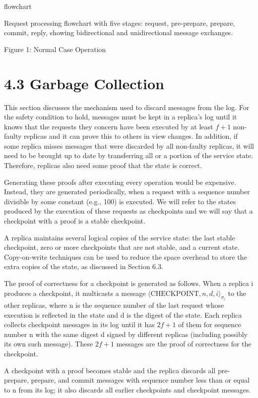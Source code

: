 \documentclass[
]{article}
\begin{document}
flowchart

Request processing flowchart with five stages: request, pre-prepare,
prepare, commit, reply, showing bidirectional and unidirectional message
exchanges.

Figure 1: Normal Case Operation

\section{4.3 Garbage Collection}\label{garbage-collection}

This section discusses the mechanism used to discard messages from the
log. For the safety condition to hold, messages must be kept in a
replica's log until it knows that the requests they concern have been
executed by at least \(f + 1\) non-faulty replicas and it can prove this
to others in view changes. In addition, if some replica misses messages
that were discarded by all non-faulty replicas, it will need to be
brought up to date by transferring all or a portion of the service
state. Therefore, replicas also need some proof that the state is
correct.

Generating these proofs after executing every operation would be
expensive. Instead, they are generated periodically, when a request with
a sequence number divisible by some constant (e.g., 100) is executed. We
will refer to the states produced by the execution of these requests as
checkpoints and we will say that a checkpoint with a proof is a stable
checkpoint.

A replica maintains several logical copies of the service state: the
last stable checkpoint, zero or more checkpoints that are not stable,
and a current state. Copy-on-write techniques can be used to reduce the
space overhead to store the extra copies of the state, as discussed in
Section 6.3.

The proof of correctness for a checkpoint is generated as follows. When
a replica i produces a checkpoint, it multicasts a message
\(\langle\text{CHECKPOINT},n,d,i\rangle_{\sigma_{i}}\) to the other
replicas, where n is the sequence number of the last request whose
execution is reflected in the state and d is the digest of the state.
Each replica collects checkpoint messages in its log until it has
\(2f + 1\) of them for sequence number n with the same digest d signed
by different replicas (including possibly its own such message). These
\(2f + 1\) messages are the proof of correctness for the checkpoint.

A checkpoint with a proof becomes stable and the replica discards all
pre-prepare, prepare, and commit messages with sequence number less than
or equal to n from its log; it also discards all earlier checkpoints and
checkpoint messages.
\end{document}
